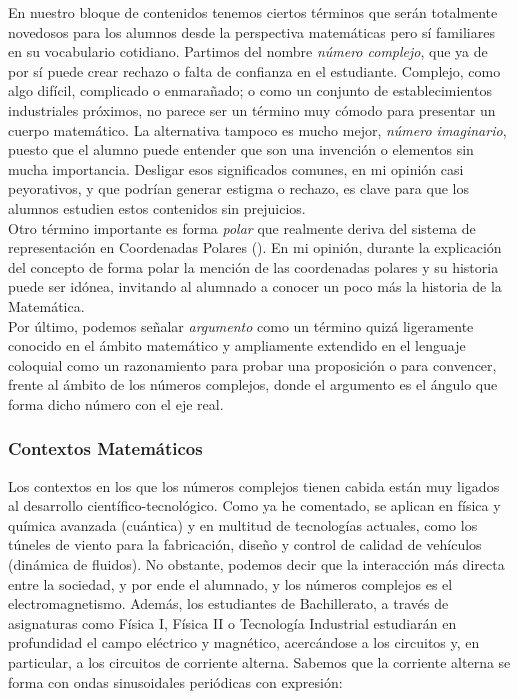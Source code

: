\documentclass[../main.tex]{memoir}
\begin{document}
En nuestro bloque de contenidos tenemos ciertos términos que serán totalmente novedosos para los alumnos desde la perspectiva matemáticas pero sí familiares en su vocabulario cotidiano. Partimos del nombre \textit{número complejo}, que ya de por sí puede crear rechazo o falta de confianza en el estudiante. Complejo, como algo difícil, complicado o enmarañado; o como un conjunto de establecimientos industriales próximos, no parece ser un término muy cómodo para presentar un cuerpo matemático. La alternativa tampoco es mucho mejor, \textit{número imaginario}, puesto que el alumno puede entender que son una invención o elementos sin mucha importancia. Desligar esos significados comunes, en mi opinión casi peyorativos, y que podrían generar estigma o rechazo, es clave para que los alumnos estudien estos contenidos sin prejuicios. \\

Otro término importante es forma \textit{polar} que realmente deriva del sistema de representación en Coordenadas Polares (\cite{adams2013}). En mi opinión, durante la explicación del concepto de forma polar la mención de las coordenadas polares y su historia puede ser idónea, invitando al alumnado a conocer un poco más la historia de la Matemática. \\

Por último, podemos señalar \textit{argumento} como un término quizá ligeramente conocido en el ámbito matemático y ampliamente extendido en el lenguaje coloquial como un razonamiento para probar una proposición o para convencer, frente al ámbito de los números complejos, donde el argumento es el ángulo que forma dicho número con el eje real.

\subsubsection{Contextos Matemáticos}

Los contextos en los que los números complejos tienen cabida están muy ligados al desarrollo científico-tecnológico. Como ya he comentado, se aplican en física y química avanzada (cuántica) y en multitud de tecnologías actuales, como los túneles de viento para la fabricación, diseño y control de calidad de vehículos (dinámica de fluidos). No obstante, podemos decir que la interacción más directa entre la sociedad, y por ende el alumnado, y los números complejos es el electromagnetismo. Además, los estudiantes de Bachillerato, a través de asignaturas como Física I, Física II o Tecnología Industrial estudiarán en profundidad el campo eléctrico y magnético, acercándose a los circuitos y, en particular, a los circuitos de corriente alterna. Sabemos que la corriente alterna se forma con ondas sinusoidales periódicas con expresión:
\end{document}
